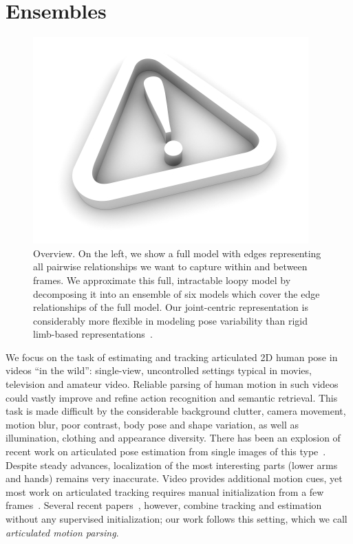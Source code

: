 \chapter{Ensembles}


\begin{figure}[t!]
\centering
\includegraphics[width=0.99\linewidth]{figs/empty.jpg}
\caption{\small \label{fig:overview} Overview. On the left, we show a full model with edges representing all pairwise relationships we want to capture within and between frames.  We approximate this full, intractable loopy model by decomposing it into an ensemble of six models which cover the edge relationships of the full model.  Our joint-centric representation is considerably more flexible in modeling pose variability than rigid limb-based representations~\cite{ferrari08,sapp2010cascades,andriluka09}.}
\label{fig:overview}
\end{figure}


We focus on the task of estimating and tracking articulated 2D human pose in videos ``in the wild'': single-view, uncontrolled settings typical in movies, television and amateur video.   Reliable
parsing of human motion in such videos could vastly improve and refine action 
recognition and semantic retrieval. This task is made difficult by the 
considerable background clutter, camera movement, motion blur, poor contrast, 
body pose and shape variation, as well as illumination, clothing and appearance 
diversity. There has been an explosion of recent work on articulated pose 
estimation from single images of this type~\cite{ronfard02, 
miko04,felzps,ramanan06,ferrari08,eichner09, andriluka09,sapp2010cascades}.  
Despite steady advances, localization of the most interesting parts (lower arms 
and hands) remains very inaccurate.  Video provides additional motion cues, yet 
most work on articulated tracking requires manual initialization from a few
frames~\cite{cardboard02,bregler98,balan06,sminchisescu03,ren07,buehler08}.  
Several recent papers~\cite{sigal04, lan05,ramanan05,ferrari08,weisssapp10}, 
however, combine tracking and estimation without any supervised initialization; 
our work follows this setting, which we call {\em articulated motion parsing}.


